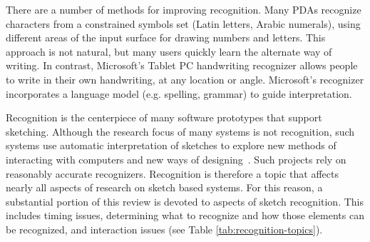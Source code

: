 There are a number of methods for improving recognition. Many PDAs
recognize characters from a constrained symbols set (Latin letters,
Arabic numerals), using different areas of the input surface for
drawing numbers and letters. This approach is not natural, but many
users quickly learn the alternate way of writing. In contrast,
Microsoft's Tablet PC handwriting recognizer allows people to write in
their own handwriting, at any location or angle. Microsoft's
recognizer incorporates a language model (e.g. spelling, grammar) to
guide interpretation.

Recognition is the centerpiece of many software prototypes that
support sketching. Although the research focus of many systems is not
recognition, such systems use automatic interpretation of sketches to
explore new methods of interacting with computers and new ways of
designing~\cite{gross-boe,grundy-maramasketch,lin-denim}. Such
projects rely on reasonably accurate recognizers. Recognition is
therefore a topic that affects nearly all aspects of research on
sketch based systems. For this reason, a substantial portion of this
review is devoted to aspects of sketch recognition. This includes
timing issues, determining what to recognize and how those elements
can be recognized, and interaction issues (see
Table \ref{tab:recognition-topics}).

